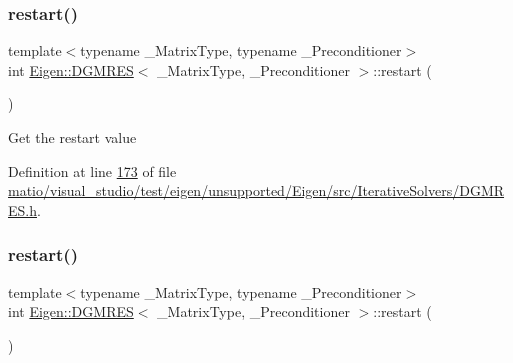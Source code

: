 \mbox{\label{class_eigen_1_1_d_g_m_r_e_s_a8017848f8ea8abc26f9524a05c0d2476}} 
\subsubsection{\texorpdfstring{restart()}{restart()}\hspace{0.1cm}{\footnotesize\ttfamily [1/2]}}
{\footnotesize\ttfamily template$<$typename \+\_\+\+Matrix\+Type, typename \+\_\+\+Preconditioner$>$ \\
int \hyperlink{class_eigen_1_1_d_g_m_r_e_s}{Eigen\+::\+D\+G\+M\+R\+ES}$<$ \+\_\+\+Matrix\+Type, \+\_\+\+Preconditioner $>$\+::restart (\begin{DoxyParamCaption}{ }\end{DoxyParamCaption})\hspace{0.3cm}{\ttfamily [inline]}}

Get the restart value 

Definition at line \hyperlink{matio_2visual__studio_2test_2eigen_2unsupported_2_eigen_2src_2_iterative_solvers_2_d_g_m_r_e_s_8h_source_l00173}{173} of file \hyperlink{matio_2visual__studio_2test_2eigen_2unsupported_2_eigen_2src_2_iterative_solvers_2_d_g_m_r_e_s_8h_source}{matio/visual\+\_\+studio/test/eigen/unsupported/\+Eigen/src/\+Iterative\+Solvers/\+D\+G\+M\+R\+E\+S.\+h}.

\mbox{\label{class_eigen_1_1_d_g_m_r_e_s_a8017848f8ea8abc26f9524a05c0d2476}} 
\subsubsection{\texorpdfstring{restart()}{restart()}\hspace{0.1cm}{\footnotesize\ttfamily [2/2]}}
{\footnotesize\ttfamily template$<$typename \+\_\+\+Matrix\+Type, typename \+\_\+\+Preconditioner$>$ \\
int \hyperlink{class_eigen_1_1_d_g_m_r_e_s}{Eigen\+::\+D\+G\+M\+R\+ES}$<$ \+\_\+\+Matrix\+Type, \+\_\+\+Preconditioner $>$\+::restart (\begin{DoxyParamCaption}{ }\end{DoxyParamCaption})\hspace{0.3cm}{\ttfamily [inline]}}


